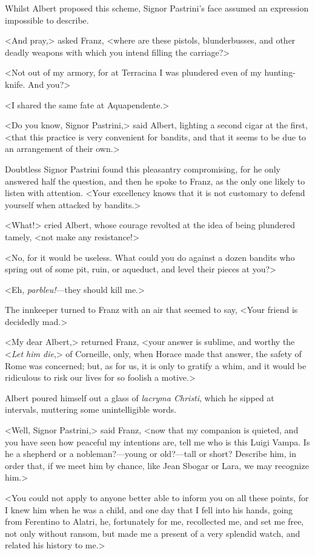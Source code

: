  Whilst Albert proposed this scheme, Signor Pastrini's face assumed an expression impossible to describe. 

 <And pray,> asked Franz, <where are these pistols, blunderbusses, and other deadly weapons with which you intend filling the carriage?> 

 <Not out of my armory, for at Terracina I was plundered even of my hunting-knife. And you?> 

 <I shared the same fate at Aquapendente.> 

 <Do you know, Signor Pastrini,> said Albert, lighting a second cigar at the first, <that this practice is very convenient for bandits, and that it seems to be due to an arrangement of their own.> 

 Doubtless Signor Pastrini found this pleasantry compromising, for he only answered half the question, and then he spoke to Franz, as the only one likely to listen with attention. <Your excellency knows that it is not customary to defend yourself when attacked by bandits.> 

 <What!> cried Albert, whose courage revolted at the idea of being plundered tamely, <not make any resistance!> 

 <No, for it would be useless. What could you do against a dozen bandits who spring out of some pit, ruin, or aqueduct, and level their pieces at you?> 

 <Eh, \textit{parbleu!}—they should kill me.> 

 The innkeeper turned to Franz with an air that seemed to say, <Your friend is decidedly mad.> 

 <My dear Albert,> returned Franz, <your answer is sublime, and worthy the <\textit{Let him die},> of Corneille, only, when Horace made that answer, the safety of Rome was concerned; but, as for us, it is only to gratify a whim, and it would be ridiculous to risk our lives for so foolish a motive.> 

 Albert poured himself out a glass of \textit{lacryma Christi}, which he sipped at intervals, muttering some unintelligible words. 

 <Well, Signor Pastrini,> said Franz, <now that my companion is quieted, and you have seen how peaceful my intentions are, tell me who is this Luigi Vampa. Is he a shepherd or a nobleman?—young or old?—tall or short? Describe him, in order that, if we meet him by chance, like Jean Sbogar or Lara, we may recognize him.> 

 <You could not apply to anyone better able to inform you on all these points, for I knew him when he was a child, and one day that I fell into his hands, going from Ferentino to Alatri, he, fortunately for me, recollected me, and set me free, not only without ransom, but made me a present of a very splendid watch, and related his history to me.> 

